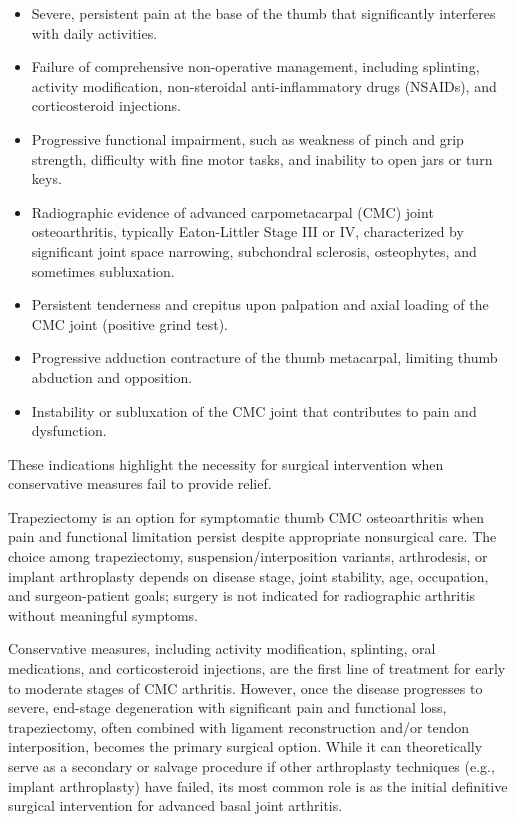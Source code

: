 \begin{itemize}
  \item Severe, persistent pain at the base of the thumb that significantly interferes with daily activities.
  \item Failure of comprehensive non-operative management, including splinting, activity modification, non-steroidal anti-inflammatory drugs (NSAIDs), and corticosteroid injections.
  \item Progressive functional impairment, such as weakness of pinch and grip strength, difficulty with fine motor tasks, and inability to open jars or turn keys.
  \item Radiographic evidence of advanced carpometacarpal (CMC) joint osteoarthritis, typically Eaton-Littler Stage III or IV, characterized by significant joint space narrowing, subchondral sclerosis, osteophytes, and sometimes subluxation.
  \item Persistent tenderness and crepitus upon palpation and axial loading of the CMC joint (positive grind test).
  \item Progressive adduction contracture of the thumb metacarpal, limiting thumb abduction and opposition.
  \item Instability or subluxation of the CMC joint that contributes to pain and dysfunction.
\end{itemize}

These indications highlight the necessity for surgical intervention when conservative measures fail to provide relief.

Trapeziectomy is an option for symptomatic thumb CMC osteoarthritis when pain and functional limitation persist despite appropriate nonsurgical care. The choice among trapeziectomy, suspension/interposition variants, arthrodesis, or implant arthroplasty depends on disease stage, joint stability, age, occupation, and surgeon-patient goals; surgery is not indicated for radiographic arthritis without meaningful symptoms.

Conservative measures, including activity modification, splinting, oral medications, and corticosteroid injections, are the first line of treatment for early to moderate stages of CMC arthritis. However, once the disease progresses to severe, end-stage degeneration with significant pain and functional loss, trapeziectomy, often combined with ligament reconstruction and/or tendon interposition, becomes the primary surgical option. While it can theoretically serve as a secondary or salvage procedure if other arthroplasty techniques (e.g., implant arthroplasty) have failed, its most common role is as the initial definitive surgical intervention for advanced basal joint arthritis.

